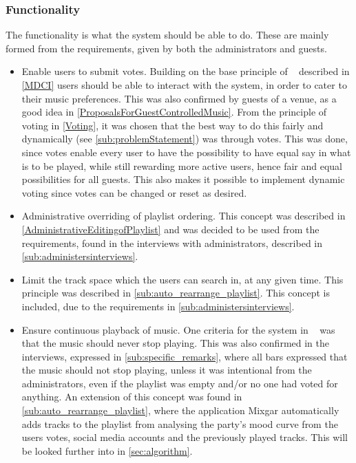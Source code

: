 \subsubsection{Functionality}
\label{subsub:functionality}
The functionality is what the system should be able to do. These are mainly formed from the requirements, given by both the administrators and guests.
\begin{itemize}
    \item Enable users to submit votes. Building on the base principle of ~\cite{sorensen2012} described in \cref{MDCI} users should be able to interact with the system, in order to cater to their music preferences. This was also confirmed by guests of a venue, as a good idea in \cref{ProposalsForGuestControlledMusic}. From the principle of voting in \cref{Voting}, it was chosen that the best way to do this fairly and dynamically (see \cref{sub:problemStatement}) was through votes. This was done, since votes enable every user to have the possibility to have equal say in what is to be played, while still rewarding more active users, hence fair and equal possibilities for all guests. This also makes it possible to implement dynamic voting since votes can be changed or reset as desired.
    \item Administrative overriding of playlist ordering. This concept was described in \cref{AdministrativeEditingofPlaylist} and was decided to be used from the requirements, found in the interviews with administrators, described in \cref{sub:administersinterviews}.
    \item Limit the track space which the users can search in, at any given time. This principle was described in \cref{sub:auto_rearrange_playlist}. This concept is included, due to the requirements in \cref{sub:administersinterviews}.
		\item Ensure continuous playback of music. One criteria for the system in ~\cite{sorensen2012} was that the music should never stop playing. This was also confirmed in the interviews, expressed in \cref{sub:specific_remarks}, where all bars expressed that the music should not stop playing, unless it was intentional from the administrators, even if the playlist was empty and/or no one had voted for anything. An extension of this concept was found in \cref{sub:auto_rearrange_playlist}, where the application Mixgar automatically adds tracks to the playlist from analysing the party’s mood curve from the users votes, social media accounts and the previously played tracks. This will be looked further into in \cref{sec:algorithm}.

\end{itemize}
